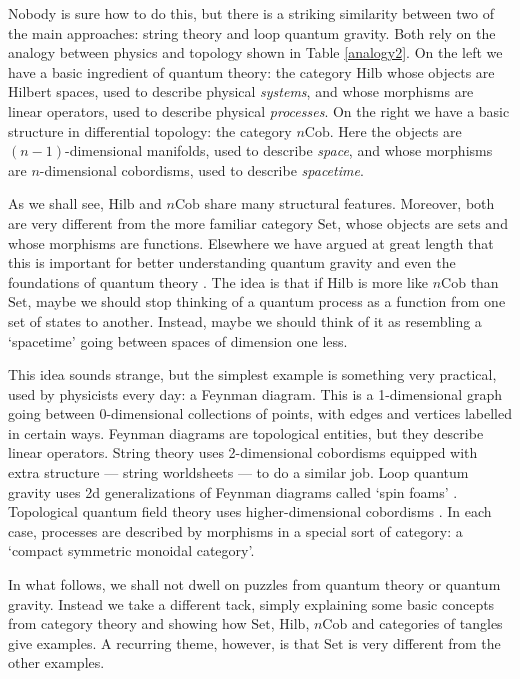\documentclass[12pt]{article}
\newcommand{\Cob}{\mathrm{Cob}}
\newcommand{\Hilb}{\mathrm{Hilb}}
\newcommand{\Set}{\mathrm{Set}}
\begin{document}
Nobody is sure how to do this, but there is a striking similarity
between two of the main approaches: string theory and loop quantum
gravity.  Both rely on the analogy between physics and
topology shown in Table \ref{analogy2}.
On the left we have a basic ingredient of quantum theory: 
the category $\Hilb$ whose objects are Hilbert spaces, used to describe
physical {\em systems}, and whose morphisms are linear operators,
used to describe physical {\em processes}.  On the right we have
a basic structure in differential topology: the category $n\Cob$.
Here the objects are $(n-1)$-dimensional manifolds, used to describe
{\em space}, and whose morphisms are $n$-dimensional cobordisms,
used to describe {\em spacetime}.  

As we shall see, $\Hilb$ and $n\Cob$ share many structural features.
Moreover, both are very different from the more familiar category $\Set$, 
whose objects are sets and whose morphisms are functions. Elsewhere 
we have argued at great length that this is important for better 
understanding quantum gravity \cite{B3} and even the foundations of
quantum theory \cite{B4}.  The idea is that if $\Hilb$ is more like 
$n\Cob$ than $\Set$, maybe we should stop thinking of a quantum process 
as a function from one set of states to another.  Instead, maybe we 
should think of it as resembling a `spacetime' going between spaces 
of dimension one less.   

This idea sounds strange, but the simplest example is something very 
practical, used by physicists every day: a Feynman diagram.  This is 
a 1-dimensional graph going between 0-dimensional collections 
of points, with edges and vertices labelled in certain ways.  Feynman
diagrams are topological entities, but they describe linear operators.
String theory uses 2-dimensional cobordisms equipped with extra
structure --- string worldsheets --- to do a similar job.  Loop quantum 
gravity uses 2d generalizations of Feynman diagrams called `spin 
foams' \cite{B2}.  Topological quantum field theory uses higher-dimensional
cobordisms \cite{BD}.  In each case, processes are described by
morphisms in a special sort of category: a `compact symmetric monoidal
category'.

In what follows, we shall not dwell on puzzles from quantum theory or
quantum gravity.  Instead we take a different tack, simply explaining 
some basic concepts from category theory and showing how $\Set$, 
$\Hilb$, $n\Cob$ and categories of tangles give examples.  A recurring 
theme, however, is that $\Set$ is very different from the other examples.
\end{document}
